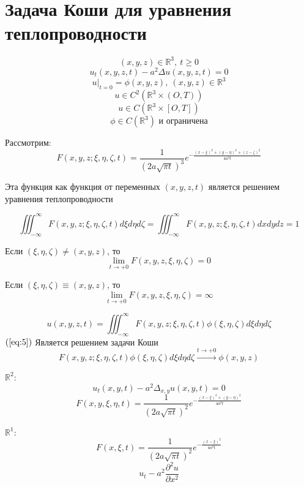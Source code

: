 \documentclass[a4paper]{article}
\theoremstyle{definition}
\theoremstyle{remark}
\begin{document}
\section*{Задача Коши для уравнения теплопроводности}

\[
    (x,y,z) \in \mathbb{R}^3, \ t \geq 0
\]
\begin{equation}
    u_t(x,y,z,t) - a^2 \Delta u(x,y,z,t) = 0
\end{equation}
\begin{equation}
    u|_{t=0} = \phi(x,y,z), \ (x,y,z) \in \mathbb{R}^3
\end{equation}
\[
    u \in C^2(\mathbb{R}^3 \times (O, T))
\]
\[
    u \in C(\mathbb{R}^3 \times [O, T])
\]
\[
    \phi \in C(\mathbb{R}^3) \text{ и ограничена}
\]

Рассмотрим:
\begin{equation}
    F(x,y,z; \xi, \eta, \zeta, t) = \frac{1}{(2a \sqrt{\pi t})^3} 
    e^{-\frac{(x-\xi)^2 + (y-\eta)^2 + (z-\zeta)^2}{4a^2 t} }
\end{equation}

Эта функция как функция от переменных $ (x,y,z,t) $ является решением уравнения
теплопроводности

\begin{equation}
    \iiint_{-\infty}^{\infty} F(x,y,z; \xi, \eta, \zeta, t)d\xi d\eta d\zeta = 
    \iiint_{-\infty}^{\infty} F(x,y,z; \xi, \eta, \zeta, t) dx dy dz = 1
\end{equation}

Если $ (\xi, \eta, \zeta) \neq (x,y,z) $, то
\[
    \lim_{t \to +0} F(x,y,z,\xi,\eta,\zeta) = 0
\]

Если $ (\xi, \eta, \zeta) \equiv (x,y,z) $, то
\[
    \lim_{t \to +0} F(x,y,z,\xi,\eta,\zeta) = \infty
\]

\begin{equation}
    u(x,y,z,t) = \iiint_{-\infty}^{\infty} F(x,y,z; \xi, \eta, \zeta, t)
    \phi(\xi,\eta,\zeta) d\xi d\eta d\zeta
    \label{eq:5}
\end{equation}
$ (\ref{eq:5}) $ Является решением задачи Коши 
\[
    F(x,y,z; \xi, \eta, \zeta, t) \phi(\xi,\eta,\zeta) d\xi d\eta d\zeta 
    \xrightarrow{t\to +0} \phi(x,y,z)
\]

$ \mathbb{R}^2 $:
\[
    u_t(x,y,t) - a^2 \Delta_{x,y} u(x,y,t) = 0
\]
\[
    F(x,y,\xi,\eta,t) = \frac{1}{(2a \sqrt{\pi t})^2}
    e^{-\frac{(x-\xi)^2 + (y-\eta)^2}{4a^2t} } 
\]

$ \mathbb{R}^{1} $:
\[
    F(x,\xi,t) = \frac{1}{(2a \sqrt{\pi t})^2} e^{-\frac{(x-\xi)^2}{4a^2t}}
\]
\[
    u_t - a^2 \frac{\partial^{2} u}{\partial x^2} 
\]
\end{document}
